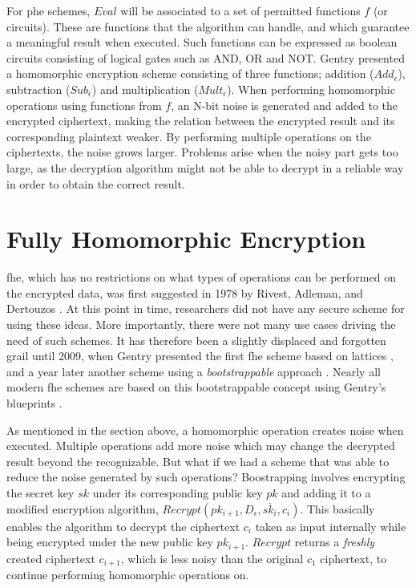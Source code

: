 For \gls{phe} schemes, $Eval$ will be associated to a set of permitted functions $f$ (or circuits). These are functions that the algorithm can handle, and which guarantee a meaningful result when executed. Such functions can be expressed as boolean circuits consisting of logical gates such as AND, OR and NOT. Gentry \cite{Gentry_computing_arb_func_enc_data} presented a homomorphic encryption scheme consisting of three functions; addition ($Add_{\epsilon}$), subtraction ($Sub_{\epsilon}$) and multiplication ($Mult_{\epsilon}$). When performing homomorphic operations using functions from $f$, an N-bit noise is generated and added to the encrypted ciphertext, making the relation between the encrypted result and its corresponding plaintext weaker. By performing multiple operations on the ciphertexts, the noise grows larger. Problems arise when the noisy part gets too large, as the decryption algorithm might not be able to decrypt in a reliable way in order to obtain the correct result.

\section{Fully Homomorphic Encryption}

\Gls{fhe}, which has no restrictions on what types of operations can be performed on the encrypted data, was first suggested in 1978 by Rivest, Adleman, and Dertouzos \cite{rivest1978data}. At this point in time, researchers did not have any secure scheme for using these ideas. More importantly, there were not many use cases driving the need of such schemes. It has therefore been a slightly displaced and forgotten grail until 2009,
when Gentry presented the first \gls{fhe} scheme based on lattices \cite{Gentry_first_lattices}, and a year later another scheme using a \emph{bootstrappable} approach \citep{Gentry_computing_arb_func_enc_data}. Nearly all modern \gls{fhe} schemes are based on this bootstrappable concept using Gentry's blueprints \cite{vaikun}. 

As mentioned in the section above, a homomorphic operation creates noise when executed. Multiple operations add more noise which may change the decrypted result beyond the recognizable. But what if we had a scheme that was able to reduce the noise generated by such operations? Boostrapping involves encrypting the secret key $sk$ under its corresponding public key $pk$ and adding it to a modified encryption algorithm, $Recrypt(pk_{i+1}, D_{\epsilon}, \overline{sk_i}, c_i)$. This basically enables the algorithm to decrypt the ciphertext $c_i$ taken as input internally while being encrypted under the new public key $pk_{i+1}$. $Recrypt$ returns a \emph{freshly} created ciphertext $c_{i+1}$, which is less noisy than the original $c_1$ ciphertext, to continue performing homomorphic operations on.

